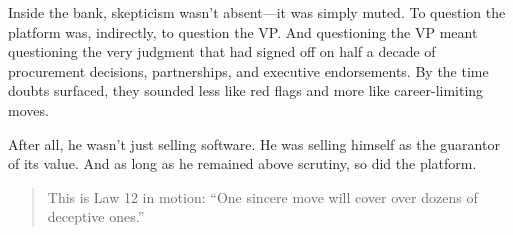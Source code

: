 Inside the bank, skepticism wasn’t absent—it was simply muted. To question the platform was, indirectly, to question the VP. And questioning the VP meant questioning the very judgment that had signed off on half a decade of procurement decisions, partnerships, and executive endorsements. By the time doubts surfaced, they sounded less like red flags and more like career-limiting moves.

After all, he wasn’t just selling software. He was selling himself as the guarantor of its value. And as long as he remained above scrutiny, so did the platform.

\medskip

\begin{quote}
This is Law 12 in motion: ``One sincere move will cover over dozens of deceptive ones.''
\end{quote}

